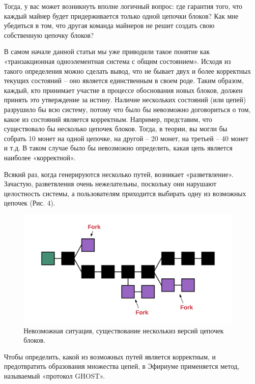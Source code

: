 \documentclass{article}
\begin{document}
Тогда, у вас может возникнуть вполне логичный вопрос: где гарантия того, что каждый майнер будет придерживается только одной цепочки блоков? Как мне убедиться в том, что другая команда майнеров не решит создать свою собственную цепочку блоков?

В самом начале данной статьи мы уже приводили такое понятие как «транзакционная одноэлементная система с общим состоянием». Исходя из такого определения можно сделать вывод, что не бывает двух и более корректных текущих состояний – оно является единственным в своем роде. Таким образом, каждый, кто принимает участие в процессе обоснования новых блоков, должен принять это утверждение за истину. Наличие нескольких состояний (или цепей) разрушило бы всю систему, потому что было бы невозможно договориться о том, какое из состояний является корректным. Например, представим, что существовало бы несколько цепочек блоков. Тогда, в теории, вы могли бы собрать 10 монет на одной цепочке, на другой – 20 монет, на третьей – 40 монет и т.д. В таком случае было бы невозможно определить, какая цепь является наиболее «корректной».

Всякий раз, когда генерируются несколько путей, возникает «разветвление». Зачастую, разветвления очень нежелательны, поскольку они нарушают целостность системы, а пользователям приходится выбирать одну из возможных цепочек (Рис. 4). 

\begin{figure}
    \centering
    \includegraphics[scale=0.3]{scheme_4}
    \caption{Невозможная ситуация, существование несколькиз версий цепочек блоков.}
    \label{fig:scheme_4}
\end{figure}

Чтобы определить, какой из возможных путей является корректным, и предотвратить образования множества цепей, в Эфириуме применяется метод, называемый «протокол GHOST».
\end{document}
